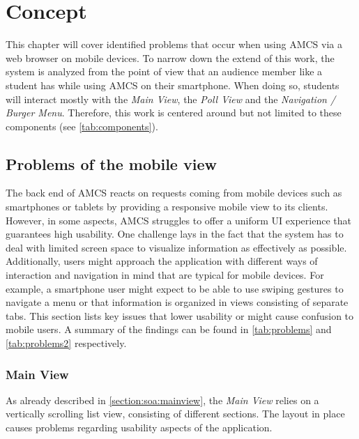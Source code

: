 \chapter{Concept}
\label{chapter:concept}
This chapter will cover identified problems that occur when using AMCS via a web browser on mobile
devices. To narrow down the extend of this work, the system is analyzed from the point of view that an audience member like a student has while using AMCS on their smartphone. When doing so, students will interact mostly with the \emph{Main View}, the \emph{Poll View} and the \emph{Navigation / Burger Menu}. Therefore, this work is centered around but not limited to these components (see \autoref{tab:components}).

\section{Problems of the mobile view}
\label{section:con:problems}
The back end of AMCS reacts on requests coming from mobile devices such as smartphones or tablets by providing a responsive mobile view to its clients. However, in some aspects, AMCS struggles to offer a uniform UI experience that guarantees high usability.
One challenge lays in the fact that the system has to deal with limited screen space to visualize information as effectively as possible. Additionally, users might approach the application with different ways of interaction and navigation in mind that are typical for mobile devices. For example, a smartphone user might expect to be able to use swiping gestures to navigate a menu or that information is organized in views consisting of separate tabs. This section lists key issues that lower usability or might cause confusion to mobile users. A summary of the findings can be found in \autoref{tab:problems} and \autoref{tab:problems2} respectively.

\subsection{Main View}
As already described in \autoref{section:soa:mainview}, the \emph{Main View} relies on a vertically scrolling list view, consisting of different sections. The layout in place causes problems regarding usability aspects of the application.

